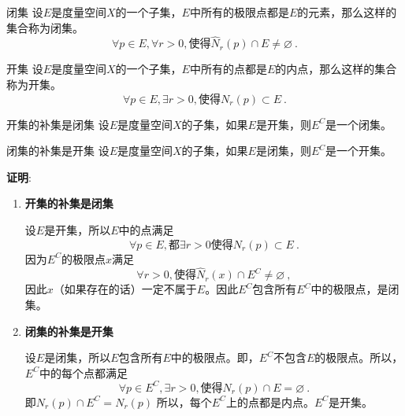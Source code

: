 \begin{definition}{闭集}
设$E$是度量空间$X$的一个子集，$E$中所有的极限点都是$E$的元素，那么这样的集合称为闭集。
\begin{equation}
\forall{p\in{E}},\forall{r>0},\text{使得}\hat{N}_r(p)\cap{E}\not=\varnothing~.
\end{equation}
\end{definition}

\begin{definition}{开集}
设$E$是度量空间$X$的一个子集，$E$中所有的点都是$E$的内点，那么这样的集合称为开集。
\begin{equation}
\forall{p\in{E}},\exists{r>0},\text{使得}N_r(p)\subset{E}~.
\end{equation}
\end{definition}

\begin{theorem}{开集的补集是闭集}
设$E$是度量空间$X$的子集，如果$E$是开集，则$E^C$是一个闭集。
\end{theorem}

\begin{corollary}{闭集的补集是开集}
设$E$是度量空间$X$的子集，如果$E$是闭集，则$E^C$是一个开集。
\end{corollary}


\textbf{证明}:
\begin{enumerate}
\item \textbf{开集的补集是闭集}

设$E$是开集，所以$E$中的点满足
\begin{equation}
\forall{p\in{E}},\text{都}\exists{r}>0\text{使得}N_r(p)\subset{E}~.
\end{equation}
因为$E^C$的极限点$x$满足
\begin{equation}
\forall{r}>0,\text{使得}\hat{N}_r(x)\cap{E^C}\not=\varnothing~,
\end{equation}
因此$x$（如果存在的话）一定不属于$E$。因此$E^C$包含所有$E^C$中的极限点，是闭集。


\item \textbf{闭集的补集是开集}

设$E$是闭集，所以$E$包含所有$E$中的极限点。即，$E^C$不包含$E$的极限点。所以，$E^C$中的每个点都满足
\begin{equation}
\forall{p}\in{E^C},\exists{r>0},\text{使得}N_r(p)\cap{E}=\varnothing~.
\end{equation}
即$N_r(p)\cap{E^C}=N_r(p)$
所以，每个$E^C$上的点都是内点。$E^C$是开集。
\end{enumerate}

